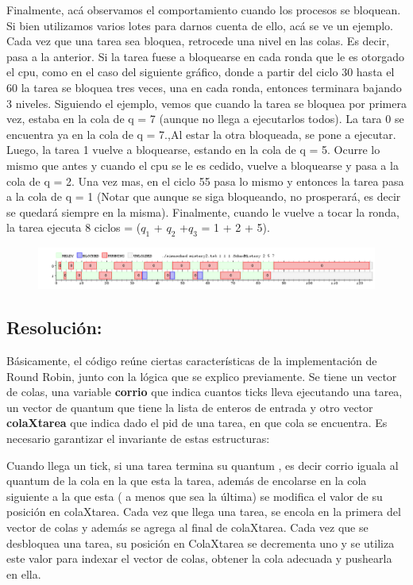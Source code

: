 \documentclass[10pt, a4paper]{article}
\begin{document}
Finalmente, acá observamos el comportamiento cuando los procesos se bloquean. Si bien utilizamos varios lotes para darnos cuenta de ello, acá se ve un ejemplo.
Cada vez que una tarea sea bloquea, retrocede una nivel en las colas. Es decir, pasa a la anterior. Si la tarea fuese a bloquearse en cada ronda que le es otorgado el cpu, como en el caso del siguiente gráfico, donde a partir del ciclo 30 hasta el 60  la tarea se bloquea tres veces, una en cada ronda, entonces terminara bajando 3 niveles. 
Siguiendo el ejemplo, vemos que cuando la tarea se bloquea por primera vez, estaba en la cola de q = 7 (aunque no llega a ejecutarlos todos). La tara 0 se encuentra ya en la cola de q = 7.,Al estar la otra bloqueada, se pone a ejecutar. Luego, la tarea 1 vuelve a bloquearse, estando en la cola de q = 5. Ocurre lo mismo que antes y cuando el cpu se le es cedido, vuelve a bloquearse y pasa a la cola de q = 2. Una vez mas, en el ciclo 55 pasa lo mismo y entonces la tarea pasa a la cola de q = 1 (Notar que aunque se siga bloqueando, no prosperará, es decir se quedará siempre en la misma). Finalmente, cuando le vuelve a tocar la ronda, la tarea ejecuta 8 ciclos = ($q_{1}$ + $q_{2}$ +$q_{3}$ = 1 + 2 + 5).   
\begin{figure}[H]
  	\centering
   	\includegraphics[width=1\textwidth]
   	 {imgs/mistery1.png}
	\caption{}
\end{figure}

\subsection{Resolución:}

Básicamente, el código reúne ciertas características de la implementación de Round Robin, junto con la lógica que se explico previamente.
Se tiene un vector de colas, una variable \textbf{corrio} que indica cuantos ticks lleva ejecutando una tarea,  un vector de quantum que tiene la lista de enteros de entrada y otro vector \textbf{colaXtarea} que indica dado el pid de una tarea, en que cola se encuentra.
Es necesario garantizar el invariante de estas estructuras:

Cuando llega un tick, si una tarea  termina su quantum , es decir corrio iguala al quantum de la cola en la que esta la tarea, además de encolarse en la cola siguiente a la que esta ( a menos que sea la última) se modifica el valor de su posición en colaXtarea.
Cada vez que llega una tarea, se encola en la primera del vector de colas y además se agrega al final de colaXtarea.
Cada vez que se desbloquea una tarea, su posición en ColaXtarea se decrementa uno y se utiliza este valor para indexar el vector de colas, obtener la cola adecuada y pushearla en ella.
\end{document}
